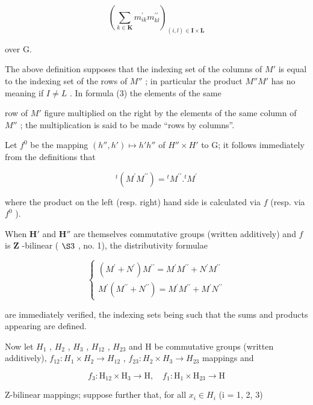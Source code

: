 \[
\left(\sum_ {k \in \mathbf {K}} m _ {i k} ^ {\prime} m _ {k l} ^ {\prime \prime}\right) _ {(i, l) \in \mathbf {I} \times \mathbf {L}}\tag{3}
\]

over G.

The above definition supposes that the indexing set of the columns of \(M'\) is equal to the indexing set of the rows of \(M''\) ; in particular the product \(M''M'\) has no meaning if \(I \neq L\) . In formula (3) the elements of the same

row of \(M'\) figure multiplied on the right by the elements of the same column of \(M''\) ; the multiplication is said to be made ``rows by columns''.

Let \(f^0\) be the mapping \((h'', h') \mapsto h'h''\) of \(H'' \times H'\) to G; it follows immediately from the definitions that

\[
{ } ^ { t } ( M ^ { \prime } M ^ { \prime \prime } ) = { } ^ { t } M ^ { \prime \prime } . { } ^ { t } M ^ { \prime }\tag{4}
\]

where the product on the left (resp. right) hand side is calculated via \(f\) (resp. via \(f^0\) ).

When \(\mathbf{H}'\) and \(\mathbf{H}''\) are themselves commutative groups (written additively) and \(f\) is \(\mathbf{Z}\) -bilinear ( \(\S 3\) , no. 1), the distributivity formulae

\[
\left\{ \begin{array}{l} (M ^ {\prime} + N ^ {\prime}) M ^ {\prime \prime} = M ^ {\prime} M ^ {\prime \prime} + N ^ {\prime} M ^ {\prime \prime} \\ M ^ {\prime} (M ^ {\prime \prime} + N ^ {\prime \prime}) = M ^ {\prime} M ^ {\prime \prime} + M ^ {\prime} N ^ {\prime \prime} \end{array} \right.\tag{5}
\]

are immediately verified, the indexing sets being such that the sums and products appearing are defined.

Now let \(H_{1}\) , \(H_{2}\) , \(H_{3}\) , \(H_{12}\) , \(H_{23}\) and H be commutative groups (written additively), \(f_{12}:H_{1} \times H_{2} \to H_{12}\) , \(f_{23}:H_{2} \times H_{3} \to H_{23}\) mappings and

\[
f _ {3}: \mathrm{H} _ {1 2} \times \mathrm{H} _ {3} \rightarrow \mathrm{H}, \quad f _ {1}: \mathrm{H} _ {1} \times \mathrm{H} _ {2 3} \rightarrow \mathrm{H}
\]

Z-bilinear mappings; suppose further that, for all \(x_{i} \in H_{i}\) (i = 1, 2, 3)

